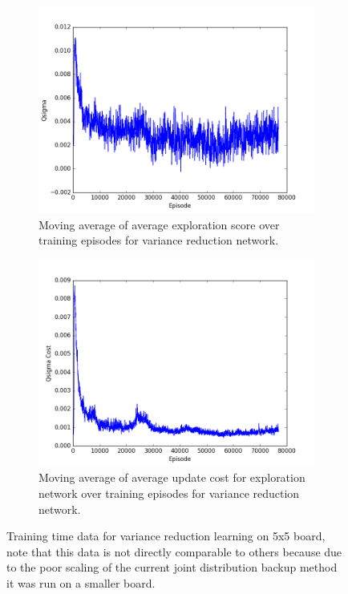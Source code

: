 \documentclass{article}
\begin{document}
\begin{figure}[!ht]
\begin{subfigure}[t]{.45\textwidth}
  \label{fig:exp_Pw_var}
\end{subfigure}\vfill
\begin{subfigure}[t]{.45\textwidth}
  \centering
      \includegraphics[width=1\textwidth]{pics/5x5_exp_Qsigma.png}
  \caption{Moving average of average exploration score over training episodes for variance reduction network.}
  \label{fig:exp_Qsigma}
\end{subfigure}\hfill
\begin{subfigure}[t]{.45\textwidth}
  \centering
      \includegraphics[width=1\textwidth]{pics/5x5_exp_Qsigma_cost.png}
  \caption{Moving average of average update cost for exploration network over training episodes for variance reduction network.}
  \label{fig:exp_Qsigma_cost}
\end{subfigure}
\caption{Training time data for variance reduction learning on 5x5 board, note that this data is not directly comparable to others because due to the poor scaling of the current joint distribution backup method it was run on a smaller board.}
\label{fig:exp}
\end{figure}
\end{document}
